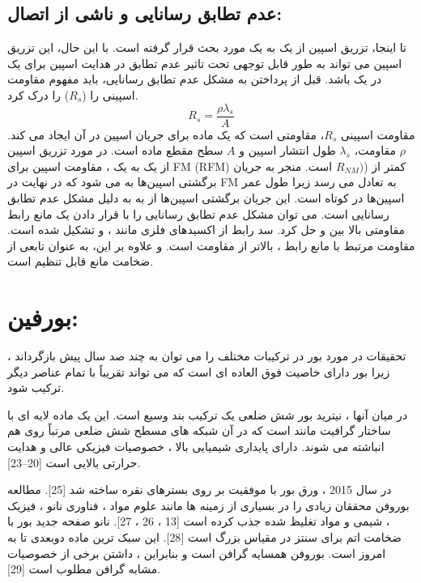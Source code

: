 \subsection{عدم تطابق رسانایی و  ناشی از اتصال:}
تا اینجا، تزریق اسپین از یک  به یک  مورد بحث قرار گرفته است. با این حال، این تزریق اسپین می تواند به طور قابل توجهی تحت تاثیر عدم تطابق در هدایت اسپین برای یک  در یک  باشد. قبل از پرداختن به مشکل عدم تطابق رسانایی، باید مفهوم مقاومت اسپینی را ($R_s$) را درک کرد.
\begin{equation}
    R_{s}=\frac{\rho\lambda_{s}}{A}
\end{equation}
مقاومت اسپینی $R_s$، مقاومتی است که یک ماده برای جریان اسپین در آن ایجاد می کند. $\rho$ مقاومت، $\lambda_s$ طول انتشار اسپین و $A$ سطح مقطع ماده است. در مورد تزریق اسپین از یک  به یک ، مقاومت اسپین برای FM (RFM) کمتر از  ($R_{NM})$ است. منجر به جریان برگشتی اسپین‌ها به  می شود که در نهایت در FM به تعادل می رسد زیرا طول عمر اسپین‌ها در  کوتاه است. این جریان برگشتی اسپین‌ها از  به  به دلیل مشکل عدم تطابق رسانایی است.
می توان مشکل عدم تطابق رسانایی را با قرار دادن یک مانع رابط مقاومتی بالا بین  و  حل کرد. سد رابط از اکسیدهای فلزی مانند ،  و  تشکیل شده است. مقاومت مرتبط با مانع رابط ، بالاتر از مقاومت  است. و علاوه بر این،  به عنوان تابعی از ضخامت مانع قابل تنظیم است.
\section{بورفین:}
تحقیقات در مورد بور در ترکیبات مختلف را می توان به چند صد سال پیش بازگرداند ، زیرا بور دارای خاصیت فوق العاده ای است که می تواند تقریباً با تمام عناصر دیگر ترکیب شود.


در میان آنها ، نیترید بور شش ضلعی  یک ترکیب بند وسیع  است. این یک ماده لایه ای با ساختار گرافیت مانند است که در آن شبکه های مسطح شش ضلعی  مرتباً روی هم انباشته می شوند.  دارای پایداری شیمیایی بالا ، خصوصیات فیزیکی عالی و هدایت حرارتی بالایی است [20–23].

در سال 2015 ، ورق بور  با موفقیت بر روی بسترهای نقره   ساخته شد [25]. مطالعه بوروفن محققان زیادی را در بسیاری از زمینه ها مانند علوم مواد ، فناوری نانو ، فیزیک ، شیمی و مواد تغلیظ شده جذب کرده است [13 ، 26 ، 27].  نانو صفحه جدید بور با ضخامت اتم برای سنتز در مقیاس بزرگ است [28]. این سبک ترین ماده دوبعدی تا به امروز است. بوروفن همسایه گرافن است و بنابراین ، داشتن برخی از خصوصیات مشابه گرافن مطلوب است [29].

